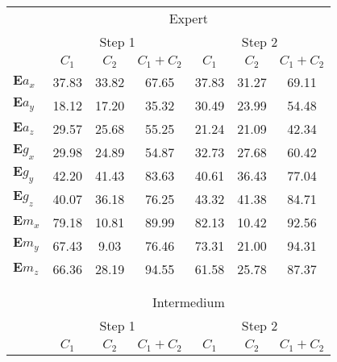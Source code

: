\documentclass{sigchi}
\begin{document}
\begin{table}
\tiny

  \centering
  
\begin{tabular}{l c c c c c c }
\toprule



& \multicolumn{6}{c}{Expert} \\
\cmidrule(r){2-7}

& \multicolumn{3}{c}{Step 1} & \multicolumn{3}{c}{Step 2}\\
\cmidrule(lr){2-4} \cmidrule(lr){5-7}

     & $C_1$  & $C_2$  & $C_1+C_2$  & $C_1$  & $C_2$  & $C_1+C_2$  \\
\midrule

$\boldsymbol{E} a_{x}$ & 37.83 & 33.82 & 67.65 & 37.83 & 31.27 & 69.11 \\
$\boldsymbol{E} a_{y}$ & 18.12 & 17.20 & 35.32 & 30.49 & 23.99 & 54.48 \\
$\boldsymbol{E} a_{z}$ & 29.57 & 25.68 & 55.25 & 21.24 & 21.09 & 42.34 \\
$\boldsymbol{E} g_{x}$ & 29.98 & 24.89 & 54.87 & 32.73 & 27.68 & 60.42 \\
$\boldsymbol{E} g_{y}$ & 42.20 & 41.43 & 83.63 & 40.61 & 36.43 & 77.04 \\
$\boldsymbol{E} g_{z}$ & 40.07 & 36.18 & 76.25 & 43.32 & 41.38 & 84.71 \\
$\boldsymbol{E} m_{x}$ & 79.18 & 10.81 & 89.99 & 82.13 & 10.42 & 92.56 \\
$\boldsymbol{E} m_{y}$ & 67.43 & 9.03 & 76.46 & 73.31 & 21.00 & \cellcolor{blue!25}94.31 \\
$\boldsymbol{E} m_{z}$ & 66.36 & 28.19 & \cellcolor{blue!25}94.55 & 61.58 & 25.78 & 87.37   \\

\\
\\
& \multicolumn{6}{c}{Intermedium} \\
\cmidrule(r){2-7}

& \multicolumn{3}{c}{Step 1} & \multicolumn{3}{c}{Step 2}\\
\cmidrule(lr){2-4} \cmidrule(lr){5-7}
     & $C_1$  & $C_2$  & $C_1+C_2$  & $C_1$  & $C_2$  & $C_1+C_2$  \\
\midrule


\end{tabular}
\end{table}
\end{document}

